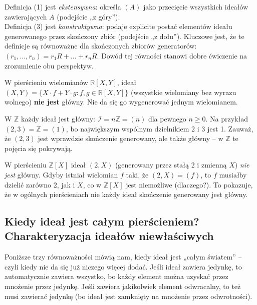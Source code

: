 \begin{remark}
Definicja (1) jest \emph{ekstensywna}: określa $(A)$ jako przecięcie wszystkich ideałów zawierających $A$ (podejście „z góry”).\\
Definicja (3) jest \emph{konstruktywna}: podaje explicite postać elementów ideału generowanego przez skończony zbiór (podejście „z dołu”). Kluczowe jest, że te definicje są równoważne dla skończonych zbiorów generatorów: $(r_1,\dots,r_n) = r_1R + \dots + r_nR$. Dowód tej równości stanowi dobre ćwiczenie na zrozumienie obu perspektyw.
\end{remark}

\begin{eg} W pierścieniu wielomianów $\mathbb{R}[X, Y]$, ideał $(X, Y) = \{ X \cdot f + Y \cdot g : f, g \in \mathbb{R}[X, Y] \}$ (wszystkie wielomiany bez wyrazu wolnego) \textbf{nie jest} główny. Nie da się go wygenerować jednym wielomianem.
\end{eg}

\begin{eg}
W $\mathbb{Z}$ każdy ideał jest główny: $\mathcal{I} = n\mathbb{Z} = (n)$ dla pewnego $n \ge 0$. Na przykład $(2,3) = \mathbb{Z} = (1)$, bo największym wspólnym dzielnikiem 2 i 3 jest 1. Zauważ, że $(2,3)$ jest wprawdzie skończenie generowany, ale także główny – w $\mathbb{Z}$ te pojęcia się pokrywają.
\end{eg}

\begin{eg}
W pierścieniu $\mathbb{Z}[X]$ ideał $(2, X)$ (generowany przez stałą 2 i zmienną $X$) \emph{nie jest} główny. Gdyby istniał wielomian $f$ taki, że $(2,X) = (f)$, to $f$ musiałby dzielić zarówno 2, jak i $X$, co w $\mathbb{Z}[X]$ jest niemożliwe (dlaczego?). To pokazuje, że w ogólnych pierścieniach nie każdy ideał skończenie generowany jest główny.
\end{eg}
\subsection*{Kiedy ideał jest całym pierścieniem? Charakteryzacja ideałów niewłaściwych}

\begin{intuition}
Poniższe trzy równoważności mówią nam, kiedy ideał jest „całym światem” – czyli kiedy nie da się już niczego więcej dodać. Jeśli ideał zawiera jedynkę, to automatycznie zawiera wszystko, bo każdy element można uzyskać przez mnożenie przez jedynkę. Jeśli zawiera jakikolwiek element odwracalny, to też musi zawierać jedynkę (bo ideał jest zamknięty na mnożenie przez odwrotności).
\end{intuition}


